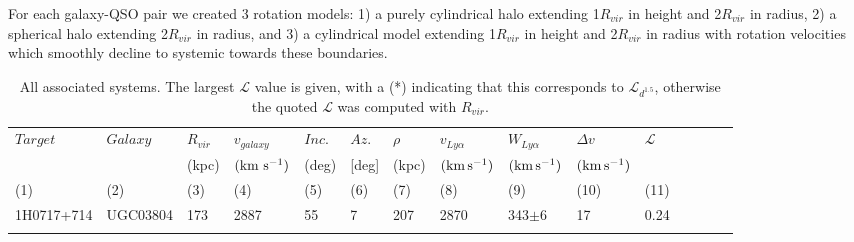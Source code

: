 \documentclass[iop]{emulateapj-rtx4}
\begin{document}
For each galaxy-QSO pair we created 3 rotation models: 1) a purely cylindrical halo extending 1$R_{vir}$ in height and 2$R_{vir}$ in radius, 2) a spherical halo extending 2$R_{vir}$ in radius, and 3) a cylindrical model extending 1$R_{vir}$ in height and 2$R_{vir}$ in radius with rotation velocities which smoothly decline to systemic towards these boundaries.





\begin{table}[ht]\footnotesize
\begin{center}
\begin{tabular}{l l l l l l l l l l l l l l l}
 \hline \hline
  $Target$	&  $Galaxy$  & $R_{vir}$        & $v_{galaxy}$ 	   	  &  $Inc.$               &  $Az.$ 	       & $\rho$		   & $v_{Ly\alpha}$	 	  	& $W_{Ly\alpha}$  & $\Delta v$  			 & $\mathcal{L}$ \\ 
  	  	&       & \scriptsize (kpc) & \scriptsize  $\rm (km ~s^{-1})$ & \scriptsize (deg) & \scriptsize [deg] & \scriptsize (kpc) & \scriptsize  $\rm (km\, s^{-1})$ & \scriptsize $\rm (km\, s^{-1})$ & \scriptsize  $\rm (km\, s^{-1})$ &  \\
 \scriptsize (1) & \scriptsize (2) & \scriptsize (3)    & \scriptsize (4)     & \scriptsize (5)    & \scriptsize (6)   & \scriptsize  (7)   & \scriptsize (8) & \scriptsize (9) & \scriptsize (10) & \scriptsize (11) \\ \hline \hline

1H0717+714  &  UGC03804  &  173  &  2887  &  55  &  7  &  207  &  2870  &  343$\pm$6  &  17  &  0.24  \\


 \\
\hline
\end{tabular}
\end{center}
  \caption{\small{All associated systems. The largest $\mathcal{L}$ value is given, with a (\**) indicating that this corresponds to $\mathcal{L}_{d^{1.5}}$, otherwise the quoted $\mathcal{L}$ was computed with $R_{vir}$.}}
  \label{target_table}
\end{table}
\end{document}
